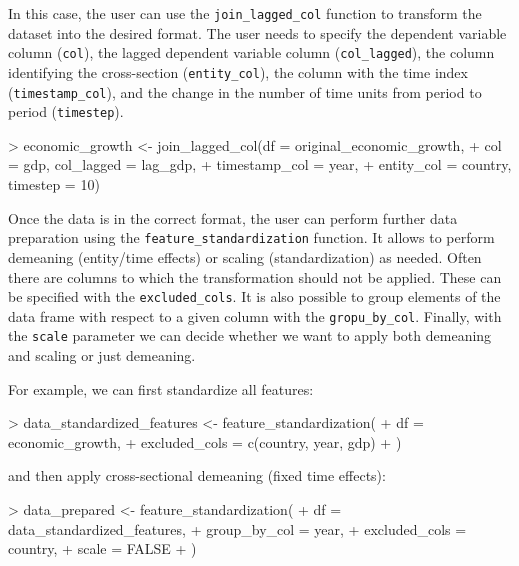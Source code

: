 \documentclass[a4paper]{article}
\begin{document}
In this case, the user can use the \verb+join_lagged_col+ function to transform the dataset into the desired format.
The user needs to specify the dependent variable column (\verb+col+), the lagged dependent variable column (\verb+col_lagged+), the column identifying the cross-section (\verb+entity_col+), the column with the time index (\verb+timestamp_col+), and the change in the number of time units from period to period (\verb+timestep+).

\begin{Schunk}
\begin{Sinput}
> economic_growth <- join_lagged_col(df = original_economic_growth,
+                         col = gdp, col_lagged = lag_gdp,
+                         timestamp_col = year,
+                         entity_col = country, timestep = 10)
\end{Sinput}
\end{Schunk}

Once the data is in the correct format,
the user can perform further data preparation
using the \verb+feature_standardization+ function.
It allows to perform demeaning (entity/time effects)
or scaling (standardization) as needed.
Often there are columns to which the transformation should not be applied.
These can be specified with the  \verb+excluded_cols+.
It is also possible to group elements of the data frame with respect to a given
column with the \verb+gropu_by_col+.
Finally, with the \verb+scale+ parameter we can decide whether we want to apply
both demeaning and scaling or just demeaning.

For example, we can first standardize all features:

\begin{Schunk}
\begin{Sinput}
> data_standardized_features <- feature_standardization(
+     df            = economic_growth,
+     excluded_cols = c(country, year, gdp)
+   )
\end{Sinput}
\end{Schunk}

\noindent and then apply cross-sectional demeaning (fixed time effects):

\begin{Schunk}
\begin{Sinput}
> data_prepared <- feature_standardization(
+     df            = data_standardized_features,
+     group_by_col  = year,
+     excluded_cols = country,
+     scale         = FALSE
+   )
\end{Sinput}
\end{Schunk}
\end{document}
